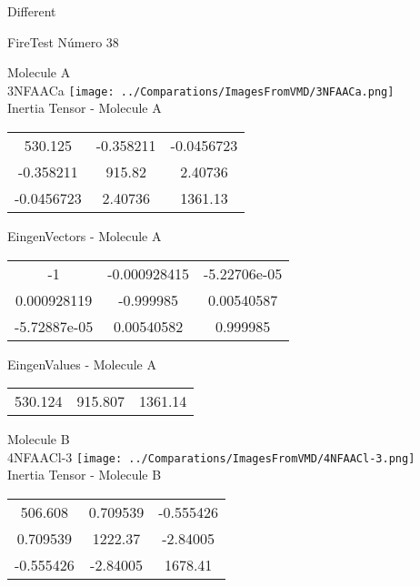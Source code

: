 \begin{center}
\vtab
\vtab
\textcolor{NavyBlue}{\Large Different}
\end{center}

 \newpage

\vtab[-2cm]
\begin{center}
{\large FireTest \tab Número 38}
\end{center}
\begin{multicols}{2}
\begin{center}

Molecule A \\ 
3NFAACa
\texttt{[image: ../Comparations/ImagesFromVMD/3NFAACa.png]}
\\
Inertia Tensor - Molecule A \\
\vtab

\begin{tabular}{|c c c|}
530.125	 & 	-0.358211	 & 	-0.0456723	 \\
-0.358211	 & 	915.82	 & 	2.40736	 \\
-0.0456723	 & 	2.40736	 & 	1361.13
\end{tabular}

\vtab
 EingenVectors - Molecule A     \\
\vtab
\begin{tabular}{|c c c|}
-1	 & 	-0.000928415	 & 	-5.22706e-05	 \\
0.000928119	 & 	-0.999985	 & 	0.00540587	 \\
-5.72887e-05	 & 	0.00540582	 & 	0.999985
\end{tabular}

\vtab
 EingenValues - Molecule A     \\
\vtab
\begin{tabular}{|c c c|}
530.124	 & 	915.807	 & 	1361.14	 \\
\end{tabular}
\columnbreak

Molecule B \\ 
4NFAACl-3
\texttt{[image: ../Comparations/ImagesFromVMD/4NFAACl-3.png]}
\\
Inertia Tensor - Molecule B \\
\vtab

\begin{tabular}{|c c c|}
506.608	 & 	0.709539	 & 	-0.555426	 \\
0.709539	 & 	1222.37	 & 	-2.84005	 \\
-0.555426	 & 	-2.84005	 & 	1678.41
\end{tabular}


\end{center}
\end{multicols}
